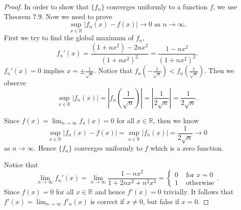 \begin{Exercise}
	\begin{proof}
		In order to show that $\{f_n\}$ converges uniformly to a function $f$, we use Theorem 7.9.
		Now we need to prove
		$$
		\sup_{x\in\mathbb{R}} |f_n(x) - f(x)| \to 0 \text{ as } n\to\infty.
		$$
		First we try to find the global maximum of $f_n$,
		$$
		f_n'(x)
		= \frac{(1+n x^2) - 2n x^2}{(1+n x^2)^2}
		= \frac{1-n x^2}{(1+n x^2)^2}.
		$$
		$f_n'(x) = 0$ implies $x = \pm\frac{1}{\sqrt{n}}$.
		Notice that $f_n(-\frac{1}{\sqrt{n}}) < f_n(\frac{1}{\sqrt{n}})$.
		Then we observe 
		$$
		\sup_{x\in\mathbb{R}}|f_n(x)|
		= \left| f_n(\frac{1}{\sqrt{n}}) \right|
		= \left| \frac{1}{2\sqrt{n}} \right|
		= \frac{1}{2\sqrt{n}}.
		$$
		
		Since $f(x) = \lim_{n\to\infty}f_n(x) = 0$ for all $x\in\mathbb{R}$, then we know
		$$
		\sup_{x\in\mathbb{R}} |f_n(x) - f(x)|
		= \sup_{x\in\mathbb{R}} |f_n(x)|
		= \frac{1}{2\sqrt{n}} \to 0
		$$
		as $n\to\infty$.
		Hence $\{f_n\}$ converges uniformly to $f$ which is a zero function.
		
		Notice that
		$$
		\lim_{n\to\infty}f_n'(x) 
		= \lim_{n\to\infty}\frac{1-n x^2}{1 + 2 n x^2 + n^2 x^4}
		= \begin{cases}
		0 & \mbox{ for } x=0 \\
		1 & \mbox{ otherwise} 
		\end{cases}.
		$$
		Since $f(x) = 0$ for all $x\in\mathbb{R}$ and hence $f'(x) = 0$ trivially.
		It follows that $f'(x) = \lim_{n\to\infty}f'_n(x)$ is correct if $x\neq 0$, but false if $x = 0$.
	\end{proof}
\end{Exercise}